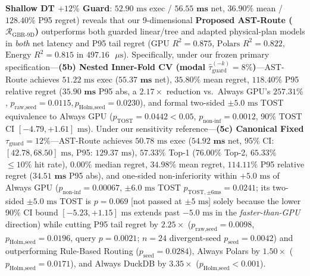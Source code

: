\documentclass[10pt,a4paper]{article}
\begin{document}
\begin{enumerate}[leftmargin=1.5em,itemsep=0.8pt]
\textbf{Shallow DT $+12\%$ Guard}: $52.90\text{ ms}$ exec / $\mathbf{56.55\text{ ms}}$ net, $36.90\%$ mean / $128.40\%$ P95 regret) reveals that our 9-dimensional \textbf{Proposed AST-Route ($\mathcal{R}_{\text{GBR-9D}}$)} outperforms both guarded linear/tree and adapted physical-plan models in \emph{both} net latency and P95 tail regret ($\text{GPU } R^2 = \mathbf{0.875}$, $\text{Polars } R^2 = \mathbf{0.822}$, $\text{Energy } R^2 = \mathbf{0.815}$ in $497.16\text{ }\mu\text{s}$). Specifically, under our frozen primary specification---\textbf{(5b) Nested Inner-Fold CV (modal $\hat{\tau}_{\text{guard}}^{(-k)}=8\%$)}---AST-Route achieves $51.22\text{ ms}$ exec ($\mathbf{55.37\text{ ms}}$ net), $35.80\%$ mean regret, $\mathbf{118.40\%}$ P95 relative regret ($\mathbf{35.90\text{ ms}}$ P95 abs, a $\mathbf{2.17\times}$ reduction vs.\ Always GPU's $257.31\%$, $p_{\text{raw,seed}}=\mathbf{0.0115}, p_{\text{Holm,seed}}=\mathbf{0.0230}$), and formal two-sided $\pm 5.0\text{ ms}$ TOST equivalence to Always GPU ($p_{\text{TOST}}=\mathbf{0.0442} < 0.05$, $p_{\text{non-inf}}=0.0012$, 90\% TOST CI $[-4.79, +1.61]\text{ ms}$). Under our sensitivity reference---\textbf{(5c) Canonical Fixed $\tau_{\text{guard}}=12\%$}---AST-Route achieves $50.78\text{ ms}$ exec ($\mathbf{54.92\text{ ms}}$ net, 95\% CI: $[42.78, 68.50]\text{ ms}$, P95: $129.37\text{ ms}$), $\mathbf{57.33\%}$ Top-1 ($\mathbf{76.00\%}$ Top-2, $\mathbf{65.33\%}$ $\le 10\%$ hit rate), $\mathbf{0.00\%}$ median regret, $\mathbf{34.98\%}$ mean regret, $\mathbf{114.11\%}$ P95 relative regret ($\mathbf{34.51\text{ ms}}$ P95 abs), and one-sided non-inferiority within $+5.0\text{ ms}$ of Always GPU ($p_{\text{non-inf}}=\mathbf{0.00067}$, $\pm 6.0\text{ ms}$ TOST $p_{\text{TOST},\pm 6\text{ms}}=0.0241$; its two-sided $\pm 5.0\text{ ms}$ TOST is $p=0.069$ [not passed at $\pm 5\text{ ms}$] solely because the lower 90\% CI bound $[-5.23, +1.15]\text{ ms}$ extends past $-5.0\text{ ms}$ in the \emph{faster-than-GPU} direction) while cutting P95 tail regret by $\mathbf{2.25\times}$ ($p_{\text{raw,seed}}=\mathbf{0.0098}$, $p_{\text{Holm,seed}}=\mathbf{0.0196}$, query $p=\mathbf{0.0021}$; $n=24$ divergent-seed $p_{\text{seed}}=\mathbf{0.0042}$) and outperforming Rule-Based Routing ($p_{\text{seed}}=0.0284$), Always Polars by $\mathbf{1.50\times}$ ($p_{\text{Holm,seed}}=0.0171$), and Always DuckDB by $\mathbf{3.35\times}$ ($p_{\text{Holm,seed}} < 0.001$).

\end{enumerate}
\end{document}
